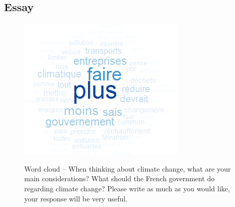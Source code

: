 \begin{framefont}{\small}
 \subsection{Essay}


 \begin{frame}{}%
 \begin{figure}[h!]
 \centering
 \caption{Word cloud -- When thinking about climate change, what are your main considerations? What should the French government do regarding climate change?
 Please write as much as you would like, your response will be very useful.}
 \includegraphics[width=.43\paperwidth]{../figures/FR/CC_field_FR.png} \\
 \end{figure}
 \end{frame}


\end{framefont}
